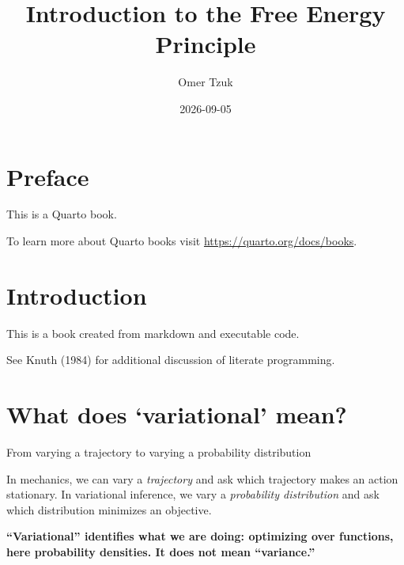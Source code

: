 \documentclass[
  letterpaper,
  DIV=11,
  numbers=noendperiod]{scrreprt}
\title{Introduction to the Free Energy Principle}
\author{Omer Tzuk}
\date{2026-09-05}
\renewcommand*\contentsname{Table of contents}
\newcommand\contentsname{Table of contents}
\begin{document}
\maketitle

\renewcommand*\contentsname{Table of contents}
{
\setcounter{tocdepth}{2}
\tableofcontents
}


\chapter*{Preface}\label{preface}


This is a Quarto book.

To learn more about Quarto books visit
\url{https://quarto.org/docs/books}.


\chapter{Introduction}\label{introduction}

This is a book created from markdown and executable code.

See Knuth (1984) for additional discussion of literate programming.


\chapter{What does `variational'
mean?}\label{what-does-variational-mean}

From varying a trajectory to varying a probability distribution

\hfill\break

\begin{tcolorbox}[enhanced jigsaw, arc=.35mm, bottomrule=.15mm, bottomtitle=1mm, breakable, colback=white, colbacktitle=quarto-callout-note-color!10!white, colframe=quarto-callout-note-color-frame, coltitle=black, left=2mm, leftrule=.75mm, opacityback=0, opacitybacktitle=0.6, rightrule=.15mm, title=\textcolor{quarto-callout-note-color}{\faInfo}\hspace{0.5em}{The question guiding this chapter}, titlerule=0mm, toprule=.15mm, toptitle=1mm]

In mechanics, we can vary a \emph{trajectory} and ask which trajectory
makes an action stationary. In variational inference, we vary a
\emph{probability distribution} and ask which distribution minimizes an
objective.

\textbf{``Variational'' identifies what we are doing: optimizing over
functions, here probability densities. It does not mean ``variance.''}

\end{tcolorbox}
\end{document}
